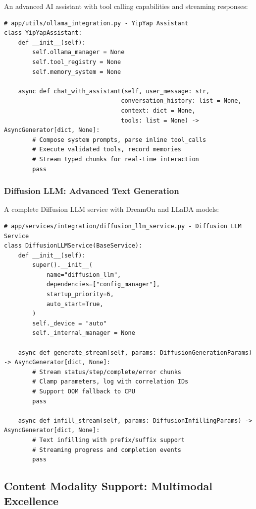 \documentclass[11pt]{article}
\begin{document}
An advanced AI assistant with tool calling capabilities and streaming responses:

\begin{lstlisting}[style=python]
# app/utils/ollama_integration.py - YipYap Assistant
class YipYapAssistant:
    def __init__(self):
        self.ollama_manager = None
        self.tool_registry = None
        self.memory_system = None
    
    async def chat_with_assistant(self, user_message: str, 
                                 conversation_history: list = None,
                                 context: dict = None,
                                 tools: list = None) -> AsyncGenerator[dict, None]:
        # Compose system prompts, parse inline tool_calls
        # Execute validated tools, record memories
        # Stream typed chunks for real-time interaction
        pass
\end{lstlisting}

\subsubsection{Diffusion LLM: Advanced Text Generation}

A complete Diffusion LLM service with DreamOn and LLaDA models:

\begin{lstlisting}[style=python]
# app/services/integration/diffusion_llm_service.py - Diffusion LLM Service
class DiffusionLLMService(BaseService):
    def __init__(self):
        super().__init__(
            name="diffusion_llm",
            dependencies=["config_manager"],
            startup_priority=6,
            auto_start=True,
        )
        self._device = "auto"
        self._internal_manager = None
    
    async def generate_stream(self, params: DiffusionGenerationParams) -> AsyncGenerator[dict, None]:
        # Stream status/step/complete/error chunks
        # Clamp parameters, log with correlation IDs
        # Support OOM fallback to CPU
        pass
    
    async def infill_stream(self, params: DiffusionInfillingParams) -> AsyncGenerator[dict, None]:
        # Text infilling with prefix/suffix support
        # Streaming progress and completion events
        pass
\end{lstlisting}

\subsection{Content Modality Support: Multimodal Excellence}
\end{document}
